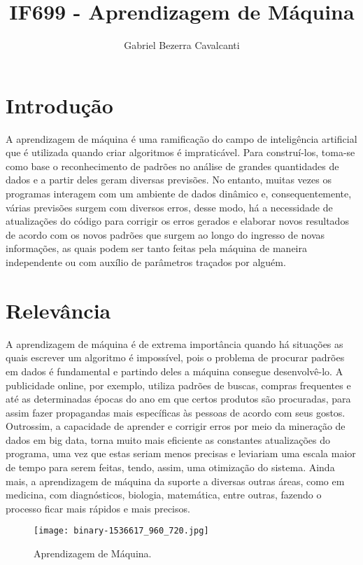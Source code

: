 \documentclass[a4paper]{article}
\title{IF699 - Aprendizagem de Máquina}
\author{Gabriel Bezerra Cavalcanti}
\begin{document}
\maketitle

\section{Introdução}
A aprendizagem de máquina é uma ramificação do campo de inteligência artificial que é utilizada quando criar algoritmos é impraticável. Para
construí-los, toma-se como base o reconhecimento de padrões no análise de grandes quantidades de dados e a partir deles geram diversas previsões. No entanto, muitas vezes os programas interagem com um ambiente de dados dinâmico e, consequentemente, várias previsões surgem com diversos erros, desse modo, há a necessidade de atualizações do código para corrigir os erros gerados e elaborar novos resultados de acordo com os novos padrões que surgem ao longo do ingresso de novas informações, as quais podem ser tanto feitas pela máquina de maneira independente ou com auxílio de parâmetros traçados por alguém. 


\section{Relevância}
A aprendizagem de máquina é de extrema importância quando há situações as quais escrever um algoritmo é impossível, pois o problema de procurar padrões em dados é fundamental e partindo deles a máquina consegue desenvolvê-lo. A publicidade online, por exemplo, utiliza padrões de buscas, compras frequentes e até as determinadas épocas do ano em que certos produtos são procuradas, para assim fazer propagandas mais específicas às pessoas de acordo com seus gostos. Outrossim, a capacidade de aprender e corrigir erros por meio da mineração de dados em big data, torna muito mais eficiente as constantes atualizações do programa, uma vez que estas seriam menos precisas e leviariam uma escala maior de tempo para serem feitas, tendo, assim, uma otimização do sistema. Ainda mais, a aprendizagem de máquina da suporte a diversas outras áreas, como em medicina, com diagnósticos, biologia, matemática, entre outras, fazendo o processo ficar mais rápidos e mais precisos.
\begin{figure}[h]
\centering
\texttt{[image: binary-1536617\_960\_720.jpg]}
\caption{\label{fig:}Aprendizagem de Máquina.}
\end{figure}
\pagebreak
\end{document}
